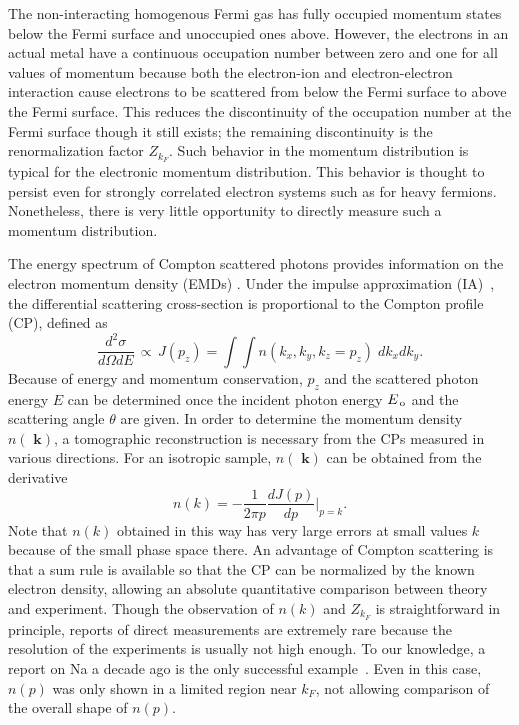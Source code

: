 \documentclass[twocolumn,showpacs,showkeys,fleqn,prl,superscriptaddress]{revtex4}%
\newcommand{\bb}[1]{\textbf{ #1}}
\newcommand{\nn}[1]{\textnormal{ #1}}
\begin{document}
The non-interacting homogenous Fermi gas has fully occupied momentum states below the  Fermi surface and unoccupied ones above.
However, the electrons in an actual metal have a continuous occupation number between zero and one for all values of momentum because both the electron-ion and electron-electron interaction cause electrons to be scattered from below the Fermi surface to above the Fermi surface. This reduces the discontinuity of the occupation number at the Fermi surface though it still exists; the remaining discontinuity is the renormalization factor $Z_{k_F}$.
Such behavior in the momentum distribution is typical for the electronic momentum distribution.
This behavior is thought to persist even for strongly correlated electron systems such as for heavy fermions.
Nonetheless, there is very little opportunity to   directly measure such a momentum distribution.

The energy spectrum of Compton scattered photons provides information on the  electron momentum density (EMDs) \cite{sch}.
Under the impulse approximation (IA)~\cite{eisen70,kaplan03}, the differential scattering cross-section is proportional to the Compton profile (CP), defined as
\begin{equation}
\frac{d^2\sigma}{d\Omega dE} \,\propto \, J(p_z) = \int \!\! \int n(k_x,k_y,k_z\!=\!p_z) \;dk_x dk_y .
\end{equation}
Because of energy and momentum conservation, $p_z$ and the scattered photon energy $E$ can be determined once the incident photon energy $E_{\nn{\!o}}$ and the scattering angle $\theta$ are given.
In order to determine the momentum density $n(\!\!\bb{k})$, a tomographic reconstruction is necessary from the CPs measured in various directions.
For an isotropic sample, $n(\!\!\bb{k})$ can be obtained from the derivative
\begin{equation}
n(k) = - \frac{1}{2 \pi p} \frac{d J(p)}{d p}  | _{p=k}   .
\end{equation}
Note that $n(k)$ obtained in this way has very large errors at small values $k$ because of the small phase space there.
An advantage of Compton scattering is that a sum rule is available so that the CP can be normalized by the known electron density, allowing an absolute quantitative comparison between theory and experiment.
Though the observation of $n(k)$ and $Z_{k_F}$ is straightforward in principle, reports of direct measurements are extremely rare because the resolution of the experiments is usually not high enough.
To our knowledge, a report on Na a decade ago is the only successful example~\cite{simo10}.
Even in this case, $n(p)$ was only shown in a limited region near $k_F$, not allowing comparison of the overall shape of $n(p)$.
\end{document}
